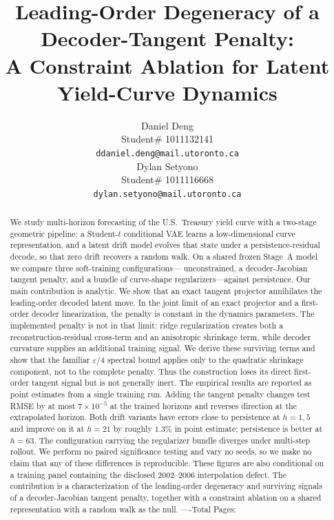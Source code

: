 \documentclass{article} %
\title{Leading-Order Degeneracy of a Decoder-Tangent Penalty:\\
A Constraint Ablation for Latent Yield-Curve Dynamics}
\author{Daniel Deng \\
Student\# 1011132141 \\
\texttt{ddaniel.deng@mail.utoronto.ca} \\
\And
Dylan Setyono \\
Student\# 1011116668 \\
\texttt{dylan.setyono@mail.utoronto.ca} \\
}
\begin{document}
\maketitle
\begin{abstract}
We study multi-horizon forecasting of the U.S.\ Treasury yield curve with a
two-stage geometric pipeline: a Student-$t$ conditional VAE learns a
low-dimensional curve representation, and a latent drift model evolves that state
under a persistence-residual decode, so that zero drift recovers a random walk.
On a shared frozen Stage~A model we compare three soft-training configurations---%
unconstrained, a decoder-Jacobian tangent penalty, and a bundle of curve-shape
regularizers---against persistence.
Our main contribution is analytic. We show that an exact tangent projector
annihilates the leading-order decoded latent move. In the joint limit of an exact
projector and a first-order decoder linearization, the penalty is constant in the
dynamics parameters. The implemented penalty is not in that limit: ridge
regularization creates both a reconstruction-residual cross-term and an anisotropic
shrinkage term, while decoder curvature supplies an additional training signal. We
derive these surviving terms and show that the familiar $\varepsilon/4$ spectral
bound applies only to the quadratic shrinkage component, not to the complete
penalty. Thus the construction loses its direct first-order tangent signal but is
not generally inert.
The empirical results are reported as point
estimates from a single training run. Adding the tangent penalty changes test RMSE
by at most $7\times10^{-5}$ at the trained horizons and reverses direction at the
extrapolated horizon. Both drift variants have errors close to persistence at
$h{=}1,5$ and improve on it at $h{=}21$ by roughly $1.3\%$ in point estimate;
persistence is better at
$h{=}63$. The configuration carrying the regularizer bundle diverges under
multi-step rollout. We perform no paired significance testing and vary no seeds, so
we make no claim that any of these differences is reproducible. These figures are
also conditional on a training panel containing the disclosed 2002--2006
interpolation defect. The contribution is a
characterization of the leading-order degeneracy and surviving signals of a
decoder-Jacobian tangent penalty, together with a constraint ablation on a shared
representation with a random walk as the null.
----Total Pages: \pageref{last_page}
\end{abstract}
\end{document}
